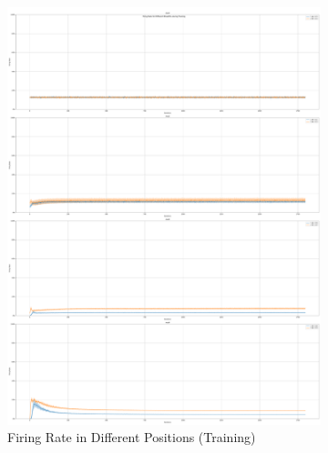         \begin{figure}[H]
            \centering
            \begin{subfigure}[H]{0.48\textwidth}
                \centering
                \includegraphics[width=\textwidth]{../firerate/DVSGesture/plots/dvsgesture_train_firerate.pdf}
                \caption{Firing Rate in Different Positions (Training)}
            \end{subfigure}
            \hfill
            \begin{subfigure}[H]{0.48\textwidth}
                \centering

\end{subfigure}
\end{figure}
